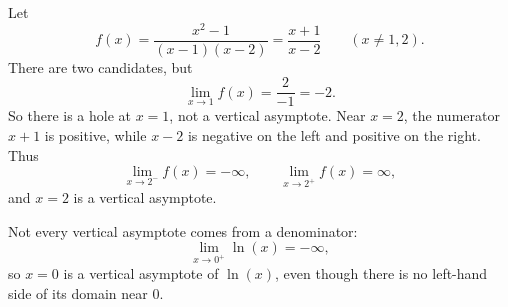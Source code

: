 \begin{exampleblock}
Let
$$f(x)=\frac{x^2-1}{(x-1)(x-2)}=\frac{x+1}{x-2}
\qquad(x\ne1,2).$$
There are two candidates, but
$$\lim_{x\to1}f(x)=\frac{2}{-1}=-2.$$
So there is a hole at $x=1$, not a vertical asymptote. Near $x=2$, the numerator
$x+1$ is positive, while $x-2$ is negative on the left and positive on
the right. Thus
$$\lim_{x\to2^-}f(x)=-\infty,\qquad
\lim_{x\to2^+}f(x)=\infty,$$
and $x=2$ is a vertical asymptote.
\end{exampleblock}

\begin{exampleblock}
Not every vertical asymptote comes from a denominator:
$$\lim_{x\to0^+}\ln(x)=-\infty,$$
so $x=0$ is a vertical asymptote of $\ln(x)$, even though there is no
left-hand side of its domain near 0.
\end{exampleblock}
